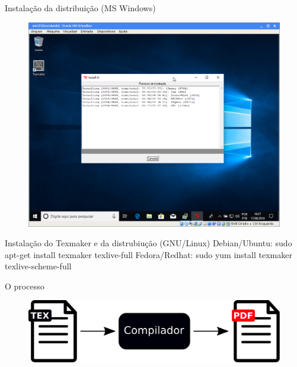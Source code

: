 \documentclass{beamer}
\begin{document}
\begin{frame}{Instala\c{c}\~ao da distribui\c{c}\~ao (MS Windows)}
    \begin{figure}[h]
        \includegraphics[scale=0.25]{fig/texlive-08.png}
    \end{figure}
\end{frame}

\begin{frame}{Instala\c{c}\~ao do Texmaker e da distrubiu\c{c}\~ao (GNU/Linux)}
    Debian/Ubuntu: sudo apt-get install texmaker texlive-full
    Fedora/Redhat: sudo yum install texmaker texlive-scheme-full
\end{frame}

\begin{frame}{O processo}
    \begin{figure}[h]
        \includegraphics[width=\textwidth]{fig/pipeline.pdf}
    \end{figure}
\end{frame}
\end{document}
